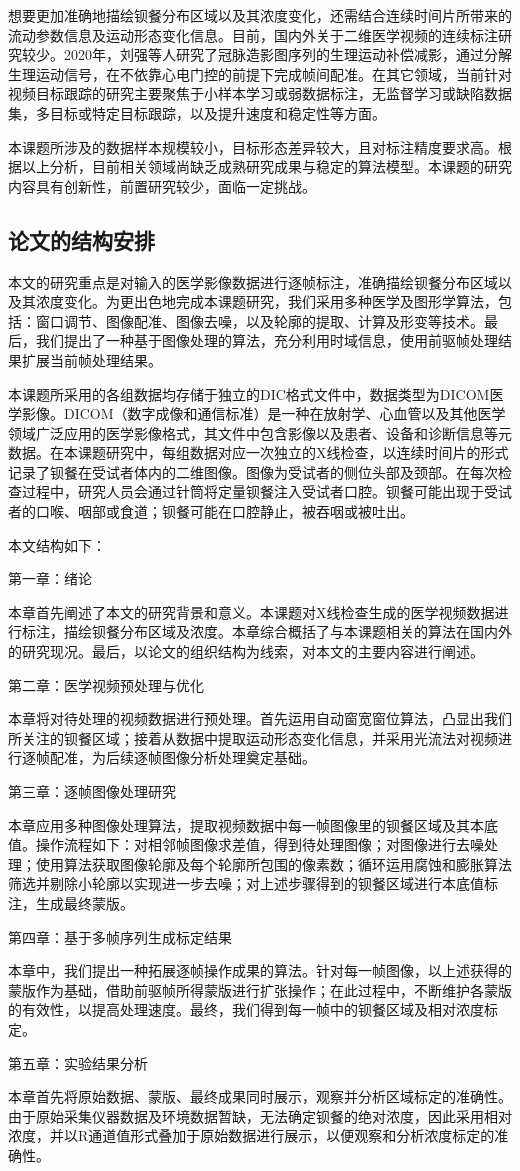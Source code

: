 想要更加准确地描绘钡餐分布区域以及其浓度变化，还需结合连续时间片所带来的流动参数信息及运动形态变化信息。目前，国内外关于二维医学视频的连续标注研究较少。2020年，刘强等人研究了冠脉造影图序列的生理运动补偿减影，通过分解生理运动信号，在不依靠心电门控的前提下完成帧间配准\cite{liu2020}。在其它领域，当前针对视频目标跟踪的研究主要聚焦于小样本学习或弱数据标注，无监督学习或缺陷数据集，多目标或特定目标跟踪，以及提升速度和稳定性等方面。

本课题所涉及的数据样本规模较小，目标形态差异较大，且对标注精度要求高。根据以上分析，目前相关领域尚缺乏成熟研究成果与稳定的算法模型。本课题的研究内容具有创新性，前置研究较少，面临一定挑战。

\subsection{论文的结构安排}

本文的研究重点是对输入的医学影像数据进行逐帧标注，准确描绘钡餐分布区域以及其浓度变化。为更出色地完成本课题研究，我们采用多种医学及图形学算法，包括：窗口调节、图像配准、图像去噪，以及轮廓的提取、计算及形变等技术。最后，我们提出了一种基于图像处理的算法，充分利用时域信息，使用前驱帧处理结果扩展当前帧处理结果。

本课题所采用的各组数据均存储于独立的DIC格式文件中，数据类型为DICOM医学影像。DICOM（数字成像和通信标准）是一种在放射学、心血管以及其他医学领域广泛应用的医学影像格式，其文件中包含影像以及患者、设备和诊断信息等元数据。在本课题研究中，每组数据对应一次独立的X线检查，以连续时间片的形式记录了钡餐在受试者体内的二维图像。图像为受试者的侧位头部及颈部。在每次检查过程中，研究人员会通过针筒将定量钡餐注入受试者口腔。钡餐可能出现于受试者的口喉、咽部或食道；钡餐可能在口腔静止，被吞咽或被吐出。

本文结构如下：

第一章：绪论

本章首先阐述了本文的研究背景和意义。本课题对X线检查生成的医学视频数据进行标注，描绘钡餐分布区域及浓度。本章综合概括了与本课题相关的算法在国内外的研究现况。最后，以论文的组织结构为线索，对本文的主要内容进行阐述。

第二章：医学视频预处理与优化

本章将对待处理的视频数据进行预处理。首先运用自动窗宽窗位算法，凸显出我们所关注的钡餐区域；接着从数据中提取运动形态变化信息，并采用光流法对视频进行逐帧配准，为后续逐帧图像分析处理奠定基础。

第三章：逐帧图像处理研究

本章应用多种图像处理算法，提取视频数据中每一帧图像里的钡餐区域及其本底值。操作流程如下：对相邻帧图像求差值，得到待处理图像；对图像进行去噪处理；使用算法获取图像轮廓及每个轮廓所包围的像素数；循环运用腐蚀和膨胀算法筛选并剔除小轮廓以实现进一步去噪；对上述步骤得到的钡餐区域进行本底值标注，生成最终蒙版。

第四章：基于多帧序列生成标定结果

本章中，我们提出一种拓展逐帧操作成果的算法。针对每一帧图像，以上述获得的蒙版作为基础，借助前驱帧所得蒙版进行扩张操作；在此过程中，不断维护各蒙版的有效性，以提高处理速度。最终，我们得到每一帧中的钡餐区域及相对浓度标定。

第五章：实验结果分析

本章首先将原始数据、蒙版、最终成果同时展示，观察并分析区域标定的准确性。由于原始采集仪器数据及环境数据暂缺，无法确定钡餐的绝对浓度，因此采用相对浓度，并以R通道值形式叠加于原始数据进行展示，以便观察和分析浓度标定的准确性。